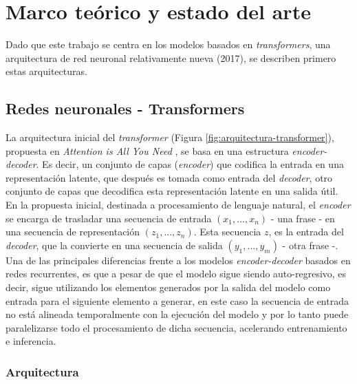 \documentclass[a4paper]{article}
\begin{document}
\section{Marco teórico y estado del arte}\label{marco_teorico_estado_arte}

Dado que este trabajo se centra en los modelos basados en \textit{transformers}, una arquitectura de red neuronal relativamente nueva (2017), se describen primero estas arquitecturas.

\subsection{Redes neuronales - Transformers}
La arquitectura inicial del \textit{transformer} (Figura \ref{fig:arquitectura-transformer}), propuesta en \textit{Attention is All You Need} \cite{NIPS2017_3f5ee243}, se basa en una estructura \textit{encoder-decoder}. Es decir, un conjunto de capas (\textit{encoder}) que codifica la entrada en una representación latente, que después es tomada como entrada del \textit{decoder}, otro conjunto de capas que decodifica esta representación latente en una salida útil. En la propuesta inicial, destinada a procesamiento de lenguaje natural, el \textit{encoder} se encarga de trasladar una secuencia de entrada $(x_1, ..., x_n)$ - una frase - en una secuencia de representación $(z_1, ..., z_n)$. Esta secuencia $z$, es la entrada del \textit{decoder}, que la convierte en una secuencia de salida $(y_1, ..., y_m)$ - otra frase -. Una de las principales diferencias frente a los modelos \textit{encoder-decoder} basados en redes recurrentes, es que a pesar de que el modelo sigue siendo auto-regresivo, es decir, sigue utilizando los elementos generados por la salida del modelo como entrada para el siguiente elemento a generar, en este caso la secuencia de entrada no está alineada temporalmente con la ejecución del modelo y por lo tanto puede paralelizarse todo el procesamiento de dicha secuencia, acelerando entrenamiento e inferencia.

\clearpage
\subsubsection{Arquitectura}
\end{document}
